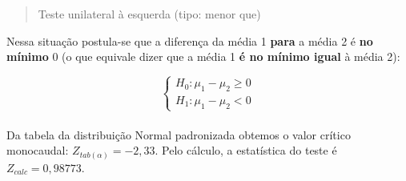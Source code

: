 \documentclass[
]{book}
\begin{document}
\begin{quote}
Teste unilateral à esquerda (tipo: menor que)
\end{quote}

\hfill\break

Nessa situação postula-se que a diferença da média 1 \textbf{para} a média 2 é \textbf{no mínimo} 0 (o que equivale dizer que a média 1 \textbf{é no mínimo igual} à média 2):

\hfill\break

\[
\begin{cases}
    H_{0}: \mu_{1} - \mu_{2} \ge 0 \\
    H_{1}: \mu_{1} - \mu_{2} < 0 
\end{cases}
\]\\

Da tabela da distribuição Normal padronizada obtemos o valor crítico monocaudal: \({Z}_{tab\left(\alpha \right)}=-2,33\). Pelo cálculo, a estatística do teste é \(Z_{calc}=0,98773\).

\hfill\break
\end{document}
